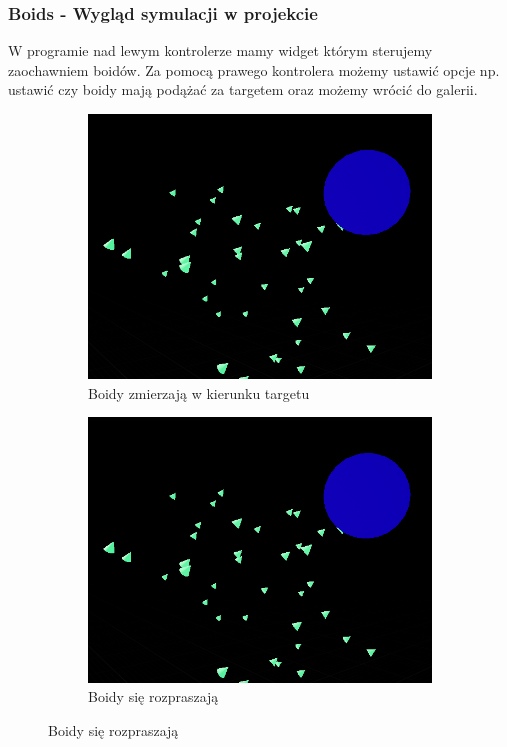 \documentclass[a4paper,12pt,reqno]{article}
\begin{document}
\newpage
\subsubsection{Boids - Wygląd symulacji w projekcie}

W programie nad lewym kontrolerze mamy widget którym sterujemy zaochawniem boidów. Za pomocą prawego kontrolera możemy ustawić opcje np. ustawić czy boidy mają podążać za targetem oraz możemy wrócić do galerii.


\begin{figure}[H]%
	\centering
	\begin{subfigure}{.5\textwidth}
		\centering
		\includegraphics[width=0.8\linewidth]{graphics//boids/BoidsInUE.png}
		\caption{Boidy zmierzają w kierunku targetu }	
		\label{ref:subref_a}
	\end{subfigure}%
	\begin{subfigure}{.5\textwidth}
		\centering
		\includegraphics[width=0.8\linewidth]{graphics//boids/BoidsInUE.png}
		\caption{Boidy się rozpraszają}
		\label{ref:subref_b}
	\end{subfigure}%
\label{ref:ref}
\end{figure}
\end{document}
